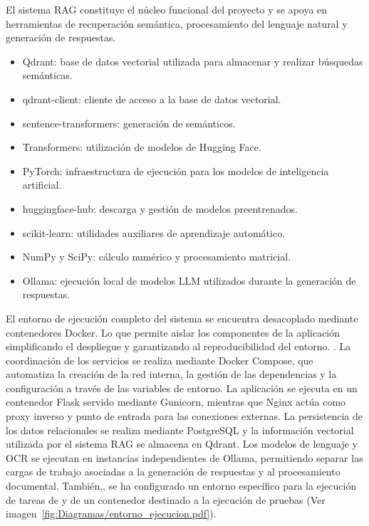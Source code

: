 El sistema RAG constituye el núcleo funcional del proyecto y se apoya en herramientas de recuperación semántica, procesamiento del lenguaje natural y generación de respuestas.

\begin{itemize}
\tightlist
	\item Qdrant: base de datos vectorial utilizada para almacenar  y realizar búsquedas semánticas.
	\item qdrant-client: cliente de acceso a la base de datos vectorial.
	\item sentence-transformers: generación de  semánticos.
	\item Transformers: utilización de modelos de Hugging Face.
	\item PyTorch: infraestructura de ejecución para los modelos de inteligencia artificial.
	\item huggingface-hub: descarga y gestión de modelos preentrenados.
	\item scikit-learn: utilidades auxiliares de aprendizaje automático.
	\item NumPy y SciPy: cálculo numérico y procesamiento matricial.
	\item Ollama: ejecución local de modelos LLM utilizados durante la generación de respuestas.
\end{itemize}

El entorno de ejecución completo del sistema se encuentra desacoplado mediante contenedores Docker. Lo que permite aislar los componentes de la aplicación simplificando el despliegue y garantizando al reproducibilidad del entorno. . La coordinación de los servicios se realiza mediante Docker Compose, que automatiza la creación de la red interna, la gestión de las dependencias y la configuración a través de las variables de entorno. La aplicación  se ejecuta en un contenedor Flask servido mediante Gunicorn, mientras que Nginx actúa como proxy inverso y punto de entrada para las conexiones externas. La persistencia de los datos relacionales se realiza mediante PostgreSQL y la información vectorial utilizada por el sistema RAG se almacena en Qdrant. Los modelos de lenguaje y OCR se ejecutan en instancias independientes de Ollama, permitiendo separar las cargas de trabajo asociadas a la generación de respuestas y al procesamiento documental. También,, se ha configurado un entorno específico para la ejecución de tareas de  y de un contenedor destinado a la ejecución de pruebas (Ver imagen~\ref{fig:Diagramas/entorno_ejecucion.pdf}).


